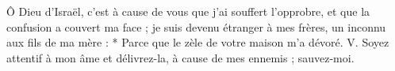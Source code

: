 Ô Dieu d’Israël, c’est à cause de vous que j’ai souffert l’opprobre, et que la confusion a couvert ma face ; je suis devenu étranger à mes frères, un inconnu aux fils de ma mère :
\versseparator
* Parce que le zèle de votre maison m’a dévoré.
\versseparator
V. Soyez attentif à mon âme et délivrez-la, à cause de mes ennemis ; sauvez-moi.
